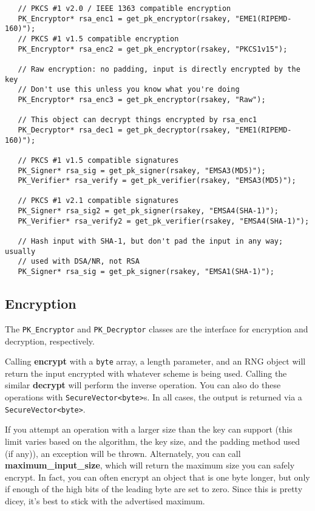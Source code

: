 \documentclass{article}
\newcommand{\function}[1]{\textbf{#1}}
\newcommand{\type}[1]{\texttt{#1}}
\begin{document}
\begin{verbatim}
   // PKCS #1 v2.0 / IEEE 1363 compatible encryption
   PK_Encryptor* rsa_enc1 = get_pk_encryptor(rsakey, "EME1(RIPEMD-160)");
   // PKCS #1 v1.5 compatible encryption
   PK_Encryptor* rsa_enc2 = get_pk_encryptor(rsakey, "PKCS1v15");

   // Raw encryption: no padding, input is directly encrypted by the key
   // Don't use this unless you know what you're doing
   PK_Encryptor* rsa_enc3 = get_pk_encryptor(rsakey, "Raw");

   // This object can decrypt things encrypted by rsa_enc1
   PK_Decryptor* rsa_dec1 = get_pk_decryptor(rsakey, "EME1(RIPEMD-160)");

   // PKCS #1 v1.5 compatible signatures
   PK_Signer* rsa_sig = get_pk_signer(rsakey, "EMSA3(MD5)");
   PK_Verifier* rsa_verify = get_pk_verifier(rsakey, "EMSA3(MD5)");

   // PKCS #1 v2.1 compatible signatures
   PK_Signer* rsa_sig2 = get_pk_signer(rsakey, "EMSA4(SHA-1)");
   PK_Verifier* rsa_verify2 = get_pk_verifier(rsakey, "EMSA4(SHA-1)");

   // Hash input with SHA-1, but don't pad the input in any way; usually
   // used with DSA/NR, not RSA
   PK_Signer* rsa_sig = get_pk_signer(rsakey, "EMSA1(SHA-1)");
\end{verbatim}

\subsection{Encryption}

The \type{PK\_Encryptor} and \type{PK\_Decryptor} classes are the interface for
encryption and decryption, respectively.

Calling \function{encrypt} with a \type{byte} array, a length
parameter, and an RNG object will return the input encrypted with
whatever scheme is being used. Calling the similar \function{decrypt}
will perform the inverse operation. You can also do these operations
with \type{SecureVector<byte>}s. In all cases, the output is returned
via a \type{SecureVector<byte>}.

If you attempt an operation with a larger size than the key can
support (this limit varies based on the algorithm, the key size, and
the padding method used (if any)), an exception will be
thrown. Alternately, you can call \function{maximum\_input\_size},
which will return the maximum size you can safely encrypt. In fact,
you can often encrypt an object that is one byte longer, but only if
enough of the high bits of the leading byte are set to zero. Since
this is pretty dicey, it's best to stick with the advertised maximum.
\end{document}
